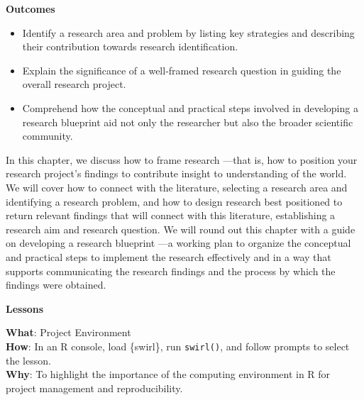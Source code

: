 \documentclass[
  letterpaper,
  krantz1]{latex/krantz-mod}
\providecommand{\tightlist}{%
  \setlength{\itemsep}{0pt}\setlength{\parskip}{0pt}}\usepackage{longtable,booktabs,array}
\newcommand{\setDOI}[1]{%
  \gdef\doi{%
    \footnotesize%
    #1\par%
    This chapter has been made available under a CC-BY-NC-ND license.%
  }%
}
\theoremstyle{definition}
\theoremstyle{definition}
\theoremstyle{remark}
\begin{document}
\setDOI{10.4324/9781003393764.4}
\thispagestyle{chapterfirstpage}

\begin{tcolorbox}[enhanced jigsaw, toprule=.15mm, breakable, colback=white, arc=.35mm, left=2mm, colframe=quarto-callout-color-frame, opacityback=0, bottomrule=.15mm, rightrule=.15mm, leftrule=.75mm]

\textbf{ Outcomes}

\begin{itemize}
\tightlist
\item
  Identify a research area and problem by listing key strategies and
  describing their contribution towards research identification.
\item
  Explain the significance of a well-framed research question in guiding
  the overall research project.
\item
  Comprehend how the conceptual and practical steps involved in
  developing a research blueprint aid not only the researcher but also
  the broader scientific community.
\end{itemize}

\end{tcolorbox}

In this chapter, we discuss how to frame research ---that is, how to
position your research project's findings to contribute insight to
understanding of the world. We will cover how to connect with the
literature, selecting a research area and identifying a research
problem, and how to design research best positioned to return relevant
findings that will connect with this literature, establishing a research
aim and research question. We will round out this chapter with a guide
on developing a research blueprint ---a working plan to organize the
conceptual and practical steps to implement the research effectively and
in a way that supports communicating the research findings and the
process by which the findings were obtained.

\begin{tcolorbox}[enhanced jigsaw, toprule=.15mm, breakable, colback=white, arc=.35mm, left=2mm, colframe=quarto-callout-color-frame, opacityback=0, bottomrule=.15mm, rightrule=.15mm, leftrule=.75mm]

\textbf{ Lessons}

\textbf{What}: Project Environment\\
\textbf{How}: In an R console, load \{swirl\}, run \texttt{swirl()}, and
follow prompts to select the lesson.\\
\textbf{Why}: To highlight the importance of the computing environment
in R for project management and reproducibility.

\end{tcolorbox}
\end{document}
